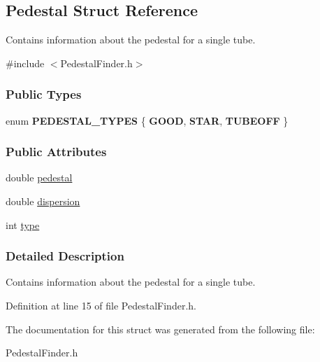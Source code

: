 \hypertarget{structPedestal}{
\subsection{Pedestal Struct Reference}
\label{structPedestal}
}


Contains information about the pedestal for a single tube.  




{\ttfamily \#include $<$PedestalFinder.h$>$}

\subsubsection*{Public Types}
\begin{DoxyCompactItemize}
\item 
enum {\bfseries PEDESTAL\_\-TYPES} \{ {\bfseries GOOD}, 
{\bfseries STAR}, 
{\bfseries TUBEOFF}
 \}
\end{DoxyCompactItemize}
\subsubsection*{Public Attributes}
\begin{DoxyCompactItemize}
\item 
\hypertarget{structPedestal_ab64edfda25e38602732a04e423efc8af}{
double \hyperlink{structPedestal_ab64edfda25e38602732a04e423efc8af}{pedestal}}
\label{structPedestal_ab64edfda25e38602732a04e423efc8af}

\item 
\hypertarget{structPedestal_a5f9004a1267829e05141ae2325e3e420}{
double \hyperlink{structPedestal_a5f9004a1267829e05141ae2325e3e420}{dispersion}}
\label{structPedestal_a5f9004a1267829e05141ae2325e3e420}

\item 
\hypertarget{structPedestal_afd05e3c5f992248f59fe670febeb71fb}{
int \hyperlink{structPedestal_afd05e3c5f992248f59fe670febeb71fb}{type}}
\label{structPedestal_afd05e3c5f992248f59fe670febeb71fb}

\end{DoxyCompactItemize}


\subsubsection{Detailed Description}
Contains information about the pedestal for a single tube. 

Definition at line 15 of file PedestalFinder.h.



The documentation for this struct was generated from the following file:\begin{DoxyCompactItemize}
\item 
PedestalFinder.h\end{DoxyCompactItemize}
